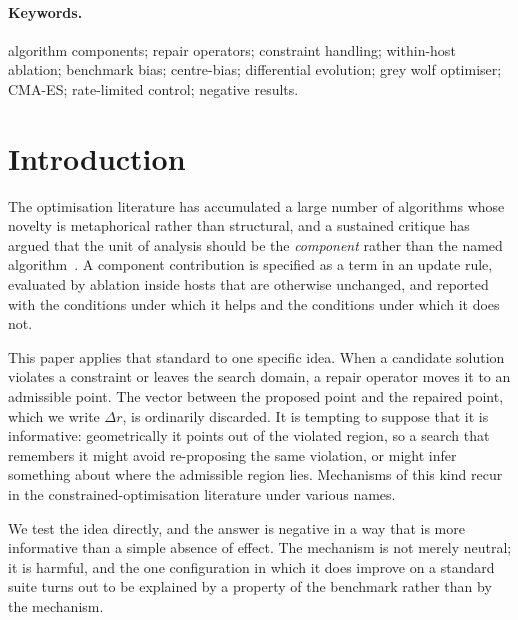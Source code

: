 \documentclass[11pt,a4paper]{article}
\begin{document}
\begin{abstract}
We conclude that displacement reuse is a control signal for rate-constrained tracking
rather than a general search signal; that benchmark results for this family should be read
as confounded unless a shifted-optimum control is reported alongside them; and that the
co-variation of benefit with repair saturation is the most promising remaining lead on the
dissociation.
\end{abstract}

\paragraph{Keywords.} algorithm components; repair operators; constraint handling;
within-host ablation; benchmark bias; centre-bias; differential evolution; grey wolf
optimiser; CMA-ES; rate-limited control; negative results.

\section{Introduction}

The optimisation literature has accumulated a large number of algorithms whose novelty is
metaphorical rather than structural, and a sustained critique has argued that the unit of
analysis should be the \emph{component} rather than the named
algorithm~\citep{sorensen2015,camacho2022}. A component contribution is specified as a
term in an update rule, evaluated by ablation inside hosts that are otherwise unchanged,
and reported with the conditions under which it helps and the conditions under which it
does not.

This paper applies that standard to one specific idea. When a candidate solution violates
a constraint or leaves the search domain, a repair operator moves it to an admissible
point. The vector between the proposed point and the repaired point, which we write
$\Delta r$, is ordinarily discarded. It is tempting to suppose that it is informative:
geometrically it points out of the violated region, so a search that remembers it might
avoid re-proposing the same violation, or might infer something about where the
admissible region lies. Mechanisms of this kind recur in the constrained-optimisation
literature under various names.

We test the idea directly, and the answer is negative in a way that is more informative
than a simple absence of effect. The mechanism is not merely neutral; it is harmful, and
the one configuration in which it does improve on a standard suite turns out to be
explained by a property of the benchmark rather than by the mechanism.
\end{document}
